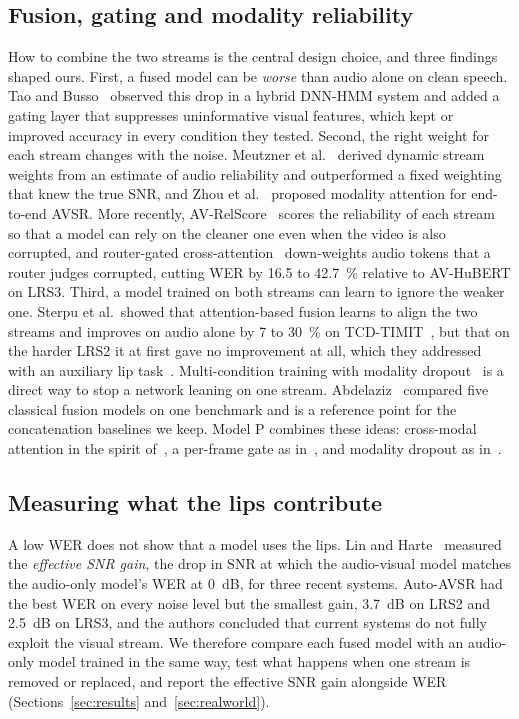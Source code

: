 \subsection{Fusion, gating and modality reliability}
How to combine the two streams is the central design choice, and three findings shaped ours. First,
a fused model can be \emph{worse} than audio alone on clean speech. Tao and Busso~\cite{tao2018}
observed this drop in a hybrid DNN-HMM system and added a gating layer that suppresses uninformative
visual features, which kept or improved accuracy in every condition they tested. Second, the right
weight for each stream changes with the noise. Meutzner et al.~\cite{meutzner2017} derived dynamic
stream weights from an estimate of audio reliability and outperformed a fixed weighting that knew
the true SNR, and Zhou et al.~\cite{zhou2019} proposed modality attention for end-to-end AVSR. More
recently, AV-RelScore~\cite{hong2023} scores the reliability of each stream so that a model can rely
on the cleaner one even when the video is also corrupted, and router-gated cross-attention~\cite{lim2025}
down-weights audio tokens that a router judges corrupted, cutting WER by 16.5 to 42.7~\% relative to
AV-HuBERT on LRS3. Third, a model trained on both streams can learn to ignore the weaker one.
Sterpu et al.\ showed that attention-based fusion learns to align the two streams and improves on
audio alone by 7 to 30~\% on TCD-TIMIT~\cite{sterpu2018}, but that on the harder LRS2 it at first
gave no improvement at all, which they addressed with an auxiliary lip task~\cite{sterpu2020}.
Multi-condition training with modality dropout~\cite{zhang2019} is a direct way to stop a network
leaning on one stream. Abdelaziz~\cite{abdelaziz2018} compared five classical fusion models on one
benchmark and is a reference point for the concatenation baselines we keep. Model P combines these
ideas: cross-modal attention in the spirit of~\cite{sterpu2018}, a per-frame gate as
in~\cite{tao2018}, and modality dropout as in~\cite{zhang2019}.

\subsection{Measuring what the lips contribute}
A low WER does not show that a model uses the lips. Lin and Harte~\cite{lin2025} measured the
\emph{effective SNR gain}, the drop in SNR at which the audio-visual model matches the audio-only
model's WER at 0~dB, for three recent systems. Auto-AVSR had the best WER on every noise level but
the smallest gain, 3.7~dB on LRS2 and 2.5~dB on LRS3, and the authors concluded that current systems
do not fully exploit the visual stream. We therefore compare each fused model with an audio-only
model trained in the same way, test what happens when one stream is removed or replaced, and report
the effective SNR gain alongside WER (Sections~\ref{sec:results} and~\ref{sec:realworld}).

